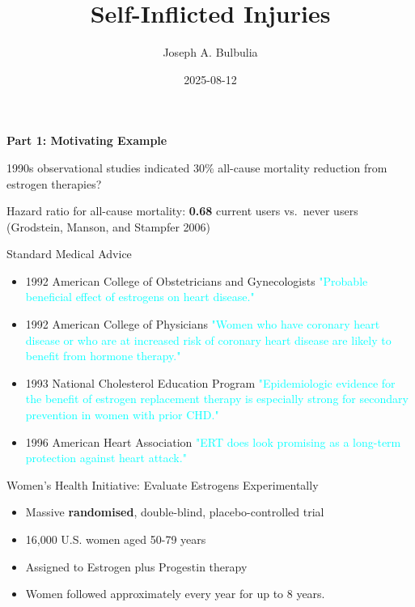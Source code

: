 \documentclass[
  ignorenonframetext,
  aspectratio=169,
]{beamer}
\title{Self-Inflicted Injuries}
\author{Joseph A. Bulbulia}
\date{2025-08-12}
\begin{document}
\frame{\titlepage}


\begin{frame}{\textbf{Part 1: Motivating Example}}
\label{part-1-motivating-example}
\begin{block}{1990s observational studies indicated 30\% all-cause
mortality reduction from estrogen therapies?}
\label{s-observational-studies-indicated-30-all-cause-mortality-reduction-from-estrogen-therapies}
\begin{tcolorbox}[enhanced jigsaw, coltitle=black, left=2mm, colback=white, rightrule=.15mm, colframe=quarto-callout-note-color-frame, opacitybacktitle=0.6, arc=.35mm, colbacktitle=quarto-callout-note-color!10!white, toprule=.15mm, bottomtitle=1mm, breakable, toptitle=1mm, opacityback=0, titlerule=0mm, title=\textcolor{quarto-callout-note-color}{\faInfo}\hspace{0.5em}{In the 1980s and 1990s estrogen treatments appeared to \textbf{benefit}
postmenopausal women}, bottomrule=.15mm, leftrule=.75mm]

Hazard ratio for all-cause mortality: \textbf{0.68} current users
vs.~never users (Grodstein, Manson, and Stampfer 2006)

\end{tcolorbox}
\end{block}

\begin{block}{Standard Medical Advice}
\label{standard-medical-advice}
\begin{itemize}
\item
  1992 American College of Obstetricians and Gynecologists
  \textcolor{cyan}{"Probable beneficial effect of estrogens on heart disease."}
\item
  1992 American College of Physicians
  \textcolor{cyan}{"Women who have coronary heart disease or who are at increased risk of coronary heart disease are likely to benefit from hormone therapy."}
\item
  1993 National Cholesterol Education Program
  \textcolor{cyan}{"Epidemiologic evidence for the benefit of estrogen replacement therapy is especially strong for secondary prevention in women with prior CHD."}
\item
  1996 American Heart Association
  \textcolor{cyan}{"ERT does look promising as a long-term protection against heart attack."}
\end{itemize}
\end{block}

\begin{block}{Women's Health Initiative: Evaluate Estrogens
Experimentally}
\label{womens-health-initiative-evaluate-estrogens-experimentally}
\begin{itemize}
\item
  Massive \textbf{randomised}, double-blind, placebo-controlled trial
\item
  16,000 U.S. women aged 50-79 years
\item
  Assigned to Estrogen plus Progestin therapy
\item
  Women followed approximately every year for up to 8 years.
\end{itemize}
\end{block}


\end{frame}
\end{document}

